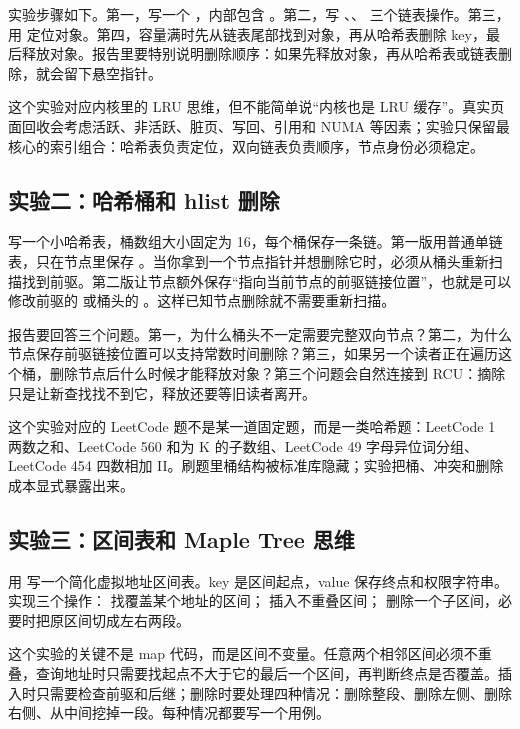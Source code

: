 实验步骤如下。第一，写一个 ，内部包含 。第二，写 、、 三个链表操作。第三，用  定位对象。第四，容量满时先从链表尾部找到对象，再从哈希表删除 key，最后释放对象。报告里要特别说明删除顺序：如果先释放对象，再从哈希表或链表删除，就会留下悬空指针。

这个实验对应内核里的 LRU 思维，但不能简单说“内核也是 LRU 缓存”。真实页面回收会考虑活跃、非活跃、脏页、写回、引用和 NUMA 等因素；实验只保留最核心的索引组合：哈希表负责定位，双向链表负责顺序，节点身份必须稳定。

\subsection{实验二：哈希桶和 hlist 删除}

写一个小哈希表，桶数组大小固定为 16，每个桶保存一条链。第一版用普通单链表，只在节点里保存 。当你拿到一个节点指针并想删除它时，必须从桶头重新扫描找到前驱。第二版让节点额外保存“指向当前节点的前驱链接位置”，也就是可以修改前驱的  或桶头的 。这样已知节点删除就不需要重新扫描。

报告要回答三个问题。第一，为什么桶头不一定需要完整双向节点？第二，为什么节点保存前驱链接位置可以支持常数时间删除？第三，如果另一个读者正在遍历这个桶，删除节点后什么时候才能释放对象？第三个问题会自然连接到 RCU：摘除只是让新查找找不到它，释放还要等旧读者离开。

这个实验对应的 LeetCode 题不是某一道固定题，而是一类哈希题：LeetCode 1 两数之和、LeetCode 560 和为 K 的子数组、LeetCode 49 字母异位词分组、LeetCode 454 四数相加 II。刷题里桶结构被标准库隐藏；实验把桶、冲突和删除成本显式暴露出来。

\subsection{实验三：区间表和 Maple Tree 思维}

用  写一个简化虚拟地址区间表。key 是区间起点，value 保存终点和权限字符串。实现三个操作： 找覆盖某个地址的区间； 插入不重叠区间； 删除一个子区间，必要时把原区间切成左右两段。

这个实验的关键不是 map 代码，而是区间不变量。任意两个相邻区间必须不重叠，查询地址时只需要找起点不大于它的最后一个区间，再判断终点是否覆盖。插入时只需要检查前驱和后继；删除时要处理四种情况：删除整段、删除左侧、删除右侧、从中间挖掉一段。每种情况都要写一个用例。

